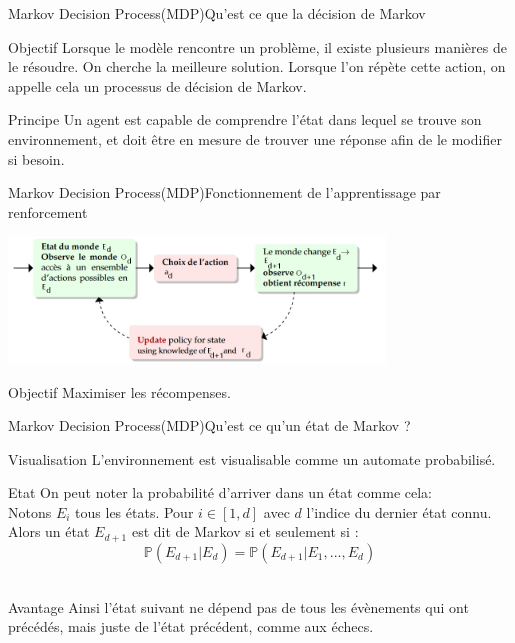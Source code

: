 
\begin{frame}{Markov Decision Process(MDP)}{Qu'est ce que la décision de Markov}
	\begin{center}
		\begin{block}{Objectif}
			Lorsque le modèle rencontre un problème, il existe plusieurs manières de le résoudre. On cherche la meilleure solution. Lorsque l'on répète cette action, on appelle cela un processus de décision de Markov. 
		\end{block}
		\begin{block}{Principe}
			Un agent est capable de comprendre l’état dans lequel se trouve son environnement, et doit être en mesure de trouver une réponse afin de le modifier si besoin.
		\end{block}
	\end{center}
\end{frame}
\begin{frame}{Markov Decision Process(MDP)}{Fonctionnement de l'apprentissage par renforcement}
	\begin{center}
		\includegraphics[width=10cm]{ressources/MDP/Fonctionnement.jpg}
	\end{center}
	\begin{block}{Objectif}
		Maximiser les récompenses.
	\end{block}
\end{frame}
\begin{frame}{Markov Decision Process(MDP)}{Qu'est ce qu'un état de Markov ?}
	\begin{center}
		
		\begin{block}{Visualisation}
			L'environnement est visualisable comme un automate probabilisé.
		\end{block}
		\begin{block}{Etat}
			On peut noter la probabilité d'arriver dans un état comme cela:\\
			Notons $E_{i}$ tous les états. Pour $i \in [1,d]$ avec $d$ l'indice du dernier état connu.\\
			Alors un état $E_{d+1}$ est dit de Markov si et seulement si :\\ 
			$$\mathbb{P}(E_{d+1} | E_{d}) = \mathbb{P}(E_{d+1} | E_{1}, ..., E_{d})$$\\
		\end{block}
		\begin{block}{Avantage}
			Ainsi l'état suivant ne dépend pas de tous les évènements qui ont précédés, mais juste de l'état précédent, comme aux échecs.
		\end{block}
	\end{center}
\end{frame}
